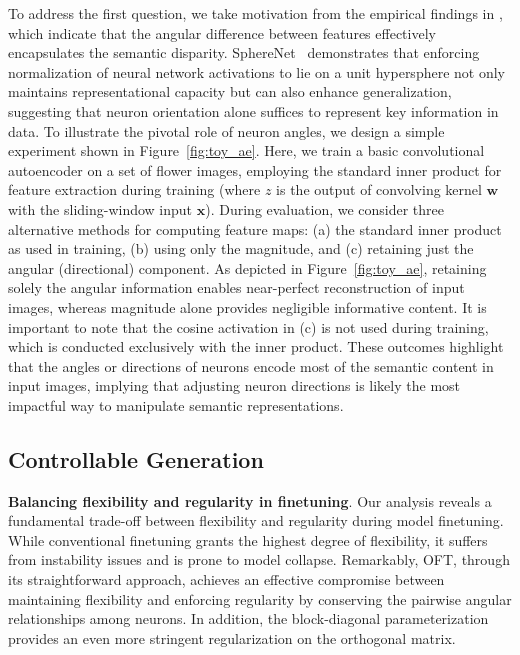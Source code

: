 To address the first question, we take motivation from the empirical findings in \cite{liu2018decoupled,chen2020angular}, which indicate that the angular difference between features effectively encapsulates the semantic disparity. SphereNet~\cite{liu2017deep} demonstrates that enforcing normalization of neural network activations to lie on a unit hypersphere not only maintains representational capacity but can also enhance generalization, suggesting that neuron orientation alone suffices to represent key information in data. To illustrate the pivotal role of neuron angles, we design a simple experiment shown in Figure~\ref{fig:toy_ae}. Here, we train a basic convolutional autoencoder on a set of flower images, employing the standard inner product for feature extraction during training (where $z$ is the output of convolving kernel $\bm{w}$ with the sliding-window input $\bm{x}$). During evaluation, we consider three alternative methods for computing feature maps: (a) the standard inner product as used in training, (b) using only the magnitude, and (c) retaining just the angular (directional) component. As depicted in Figure~\ref{fig:toy_ae}, retaining solely the angular information enables near-perfect reconstruction of input images, whereas magnitude alone provides negligible informative content. It is important to note that the cosine activation in (c) is not used during training, which is conducted exclusively with the inner product. These outcomes highlight that the angles or directions of neurons encode most of the semantic content in input images, implying that adjusting neuron directions is likely the most impactful way to manipulate semantic representations.

\subsection{Controllable Generation}

\textbf{Balancing flexibility and regularity in finetuning}. Our analysis reveals a fundamental trade-off between flexibility and regularity during model finetuning. While conventional finetuning grants the highest degree of flexibility, it suffers from instability issues and is prone to model collapse. Remarkably, OFT, through its straightforward approach, achieves an effective compromise between maintaining flexibility and enforcing regularity by conserving the pairwise angular relationships among neurons. In addition, the block-diagonal parameterization provides an even more stringent regularization on the orthogonal matrix.

